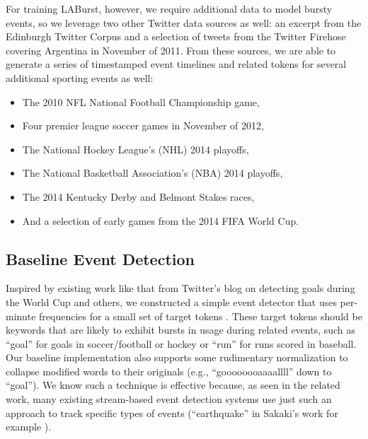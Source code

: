 \documentclass{acm_proc_article-sp}
\begin{document}
For training LABurst, however, we require additional data to model bursty events, so we leverage two other Twitter data sources as well: an excerpt from the Edinburgh Twitter Corpus \cite{Petrovic:2010:ETC:1860667.1860680} and a selection of tweets from the Twitter Firehose covering Argentina in November of 2011.
From these sources, we are able to generate a series of timestamped event timelines and related tokens for several additional sporting events as well: 
%
\begin{itemize}
\item The 2010 NFL National Football Championship game, 
\item Four premier league soccer games in November of 2012, %
\item The National Hockey League's (NHL) 2014 playoffs, 
\item The National Basketball Association's (NBA) 2014 playoffs, 
\item The 2014 Kentucky Derby and Belmont Stakes races, 
\item And a selection of early games from the 2014 FIFA World Cup.
\end{itemize}

\subsection{Baseline Event Detection}

Inspired by existing work like that from Twitter's blog on detecting goals during the World Cup and others, we constructed a simple event detector that uses per-minute frequencies for a small set of target tokens \cite{Cipriani2014}. 
These target tokens should be keywords that are likely to exhibit bursts in usage during related events, such as ``goal'' for goals in soccer/football or hockey or ``run'' for runs scored in baseball.
Our baseline implementation also supports some rudimentary normalization to collapse modified words to their originals (e.g., ``goooooooaaaallll'' down to ``goal'').
We know such a technique is effective because, as seen in the related work, many existing stream-based event detection systems use just such an approach to track specific types of events (``earthquake'' in Sakaki's work for example \cite{Sakaki:2010:EST:1772690.1772777}).
\end{document}
